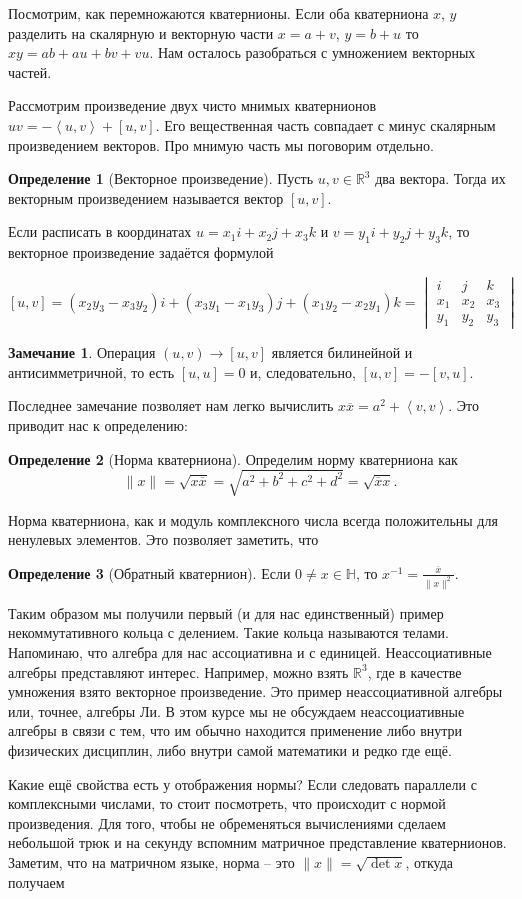 \documentclass[12pt,a4paper,oneside]{book}
\theoremstyle{definition}
\newtheorem*{rem}{\color{green!50!blue}Замечание}
\newtheorem*{defn}{\color{yellow!30!red} Определение}
\newcommand{\ovl}{\overline}
\newcommand{\R}{\mathbb R}
\renewcommand{\H}{\mathbb H}
\def\lan{\left\langle }
\def\ran{\right\rangle}
\def\dfn{\begin{defn}}
\def\edfn{\end{defn}}
\def\rm{\begin{rem}}
\def\erm{\end{rem}}
\begin{document}
Посмотрим, как перемножаются кватернионы. Если оба кватерниона  $x$, $y$ разделить на скалярную и векторную части $x=a+v$, $y=b+u$ то $xy=ab+au+bv+ vu$. Нам осталось разобраться с умножением векторных частей. 

Рассмотрим произведение двух чисто мнимых кватернионов $uv=-\lan u,v\ran+[u,v]$. Его вещественная часть совпадает с минус скалярным произведением векторов. Про мнимую часть мы поговорим отдельно.

\dfn[Векторное произведение] Пусть $u,v \in \R^3$ два вектора. Тогда их векторным произведением называется вектор $[u,v]$.
\edfn

Если расписать в координатах $u=x_1i+x_2j+x_3k$ и  $v=y_1i+y_2j+y_3k$, то векторное произведение задаётся формулой

$$[u,v]= (x_2y_3-x_3y_2)i + (x_3y_1-x_1y_3)j + (x_1y_2- x_2y_1)k= \begin{vmatrix} i& j&k \\ x_1 & x_2 & x_3 \\ y_1 & y_2 & y_3 \end{vmatrix} $$

\rm Операция $(u,v) \to [u,v]$ является билинейной и антисимметричной, то есть $[u,u]=0$ и, следовательно, $[u,v]=-[v,u]$.
\erm

Последнее замечание позволяет нам легко вычислить $x \ovl{x}= a^2+ \lan v,v \ran$. Это приводит нас к определению:

\dfn[Норма кватерниона] Определим норму кватерниона как $$\|x\|=\sqrt{x\ovl{x}}=\sqrt{ a^2+b^2+c^2+d^2}=\sqrt{\ovl{x}x}.$$
\edfn 


Норма кватерниона, как и модуль комплексного числа всегда положительны для ненулевых элементов. Это позволяет заметить, что

\dfn[Обратный кватернион] Если $0\neq x \in \H$, то $x^{-1}=\frac{\ovl{x}}{\|x\|^2}$. 
\edfn

Таким образом мы получили первый (и для нас единственный) пример некоммутативного кольца с делением. Такие кольца называются телами. Напоминаю, что алгебра для нас ассоциативна и с единицей. Неассоциативные алгебры представляют интерес. Например, можно взять $\R^3$, где в качестве умножения взято векторное произведение. Это пример неассоциативной алгебры или, точнее, алгебры Ли. В этом курсе мы не  обсуждаем неассоциативные алгебры в связи с тем, что им обычно находится применение либо внутри физических дисциплин, либо внутри самой математики и редко где ещё. 

Какие ещё свойства есть у отображения нормы? Если следовать параллели с комплексными числами, то стоит посмотреть, что происходит с нормой произведения. Для того, чтобы не обременяться вычислениями сделаем небольшой трюк и на секунду вспомним матричное представление кватернионов. Заметим, что на матричном языке, норма -- это $\|x\|=\sqrt{\det x}$, откуда получаем
\end{document}

